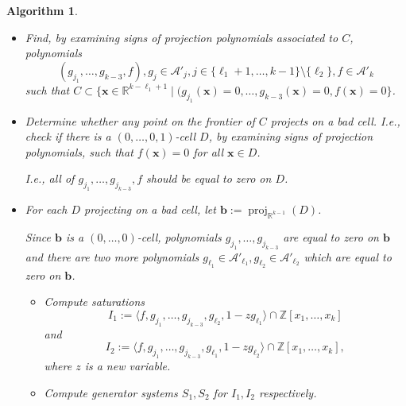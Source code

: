 \documentclass[
]{book}
\newtheorem{algorithm}{Algorithm}
\theoremstyle{definition}
\theoremstyle{definition}
\theoremstyle{definition}
\theoremstyle{definition}
\theoremstyle{remark}
\begin{document}
\begin{algorithm}
\begin{itemize}
\begin{itemize}
    I.e., Let \(C := {\operatorname{proj}_{{\operatorname{span} \{i_\ell,\ldots,i_k\}}}}(E)\) be an \((i_{\ell_1},\ldots,i_{k-1},0)\)-cell in the sub-cad of \(\mathcal{D}\) above \(\mathbf{c}\). Compute the substitution of polynomials
    \[
    \mathcal{A'}_{j} := \{ {\mathrm{sub}}_{\mathbf{c}} (f) \in \mathbb{Z}[x_{\ell_1},\ldots,x_j] \mid f \in \mathcal{A}_{i_{\ell_1} - 1 + j} \}
    \]
    for \(i_{\ell_1} \le j \le k\).
  \item
    Find, by examining signs of projection polynomials associated to \(C\), polynomials
    \[
    (g_{j_1},\ldots,g_{k-3}, f), g_j \in \mathcal{A'}_j, j \in \{\ell_1 + 1,\ldots,k-1\} \setminus \{ \ell_2 \}, f \in \mathcal{A'}_k
    \]
    such that \(C \subset \{ \mathbf{x} \in \mathbb{R}^{k-\ell_1 + 1} \mid (g_{j_1}(\mathbf{x}) = 0,\ldots,g_{k-3}(\mathbf{x}) = 0, f(\mathbf{x}) = 0 \}\).
  \item
    Determine whether any point on the frontier of \(C\) projects on a bad cell. I.e., check if there is a \((0,\ldots,0,1)\)-cell \(D\), by examining signs of projection polynomials, such that \(f(\mathbf{x}) = 0\) for all \(\mathbf{x} \in D\).

    I.e., all of \(g_{j_1},\ldots,g_{j_{k-3}},f\) should be equal to zero on \(D\).
  \item
    For each \(D\) projecting on a bad cell, let \(\mathbf{b} := {\operatorname{proj}_{\mathbb{R}^{k-1}}}(D)\).

    Since \(\mathbf{b}\) is a \((0,\ldots,0)\)-cell, polynomials \(g_{j_1},\ldots,g_{j_{k-3}}\) are equal to zero on \(\mathbf{b}\) and there are two more polynomials \(g_{\ell_1} \in \mathcal{A'}_{\ell_1}, g_{\ell_2} \in \mathcal{A'}_{\ell_2}\) which are equal to zero on \(\mathbf{b}\).

    \begin{itemize}
    \item
      Compute saturations \[
      I_1 := \langle f, g_{j_1}, \ldots, g_{j_{k-3}}, g_{\ell_2}, 1 - z g_{\ell_1} \rangle \cap \mathbb{Z}[x_1,\ldots,x_k]
      \]
      and
      \[
      I_2 := \langle f, g_{j_1}, \ldots, g_{j_{k-3}}, g_{\ell_1}, 1 - z g_{\ell_2} \rangle \cap \mathbb{Z}[x_1,\ldots,x_k],
      \]
      where \(z\) is a new variable.
    \item
      Compute generator systems \(S_1, S_2\) for \(I_1,I_2\) respectively.


\end{itemize}
\end{itemize}
\end{itemize}
\end{algorithm}
\end{document}
